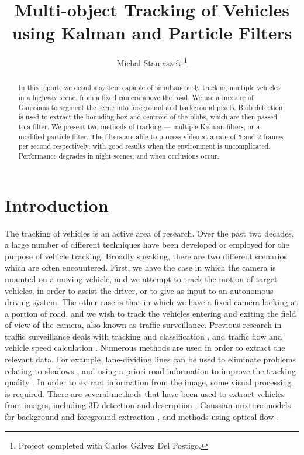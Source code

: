 \documentclass[conference]{IEEEtran}
\title{Multi-object Tracking of Vehicles using Kalman and Particle Filters}
\author{Michal Staniaszek \thanks{Project completed with Carlos G\'{a}lvez Del Postigo.}}
\begin{document}
\maketitle

\begin{abstract}
  In this report, we detail a system capable of simultaneously tracking multiple
  vehicles in a highway scene, from a fixed camera above the road. We use a
  mixture of Gaussians to segment the scene into foreground and background
  pixels. Blob detection is used to extract the bounding box and centroid of the
  blobs, which are then passed to a filter. We present two methods of tracking
  --- multiple Kalman filters, or a modified particle filter. The filters are
  able to process video at a rate of 5 and 2 frames per second respectively,
  with good results when the environment is uncomplicated. Performance degrades
  in night scenes, and when occlusions occur.
\end{abstract}


\section{Introduction}
The tracking of vehicles is an active area of research. Over the past two
decades, a large number of different techniques have been developed or employed
for the purpose of vehicle tracking. Broadly speaking, there are two different
scenarios which are often encountered. First, we have the case in which the
camera is mounted on a moving vehicle, and we attempt to track the motion of
target vehicles, in order to assist the driver, or to give as input to an
autonomous driving system. The other case is that in which we have a fixed
camera looking at a portion of road, and we wish to track the vehicles entering
and exiting the field of view of the camera, also known as traffic
surveillance. Previous research in traffic surveillance deals with tracking and
classification \cite{hsieh2006automatic,meier1999tracking}, and traffic flow and
vehicle speed calculation \cite{hsu2004real,coifman1998real}. Numerous methods
are used in order to extract the relevant data. For example, lane-dividing lines
can be used to eliminate problems relating to shadows \cite{hsieh2006automatic},
and using a-priori road information to improve the tracking quality
\cite{magee2004tracking}. In order to extract information from the image, some
visual processing is required. There are several methods that have been used to
extract vehicles from images, including 3D detection and description
\cite{kim2003fast}, Gaussian mixture models for background and foreground
extraction \cite{stauffer1999adaptive}, and methods using optical flow
\cite{javed2006tracking}.
\end{document}
